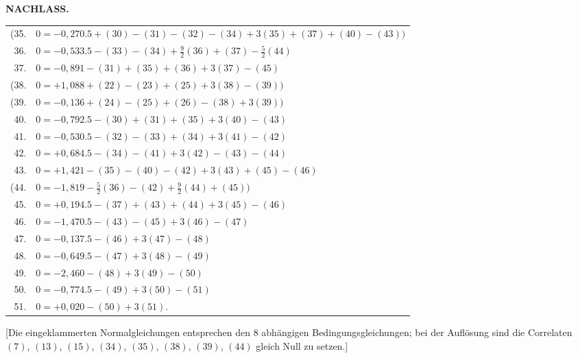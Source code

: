 \endgroup
\newpage
{}\hfill\textbf{NACHLASS.}
\begingroup
\renewcommand{\arraystretch}{1.16}
\begin{longtable}{@{}r@{\quad}l@{}}
(35.&$0=-0{,}270.5+(30)-(31)-(32)-(34)+3(35)+(37)+(40)-(43))$\\
36.&$0=-0{,}533.5-(33)-(34)+\frac92(36)+(37)-\frac52(44)$\\
37.&$0=-0{,}891-(31)+(35)+(36)+3(37)-(45)$\\
(38.&$0=+1{,}088+(22)-(23)+(25)+3(38)-(39))$\\
(39.&$0=-0{,}136+(24)-(25)+(26)-(38)+3(39))$\\
40.&$0=-0{,}792.5-(30)+(31)+(35)+3(40)-(43)$\\
41.&$0=-0{,}530.5-(32)-(33)+(34)+3(41)-(42)$\\
42.&$0=+0{,}684.5-(34)-(41)+3(42)-(43)-(44)$\\
43.&$0=+1{,}421-(35)-(40)-(42)+3(43)+(45)-(46)$\\
(44.&$0=-1{,}819-\frac52(36)-(42)+\frac92(44)+(45))$\\
45.&$0=+0{,}194.5-(37)+(43)+(44)+3(45)-(46)$\\
46.&$0=-1{,}470.5-(43)-(45)+3(46)-(47)$\\
47.&$0=-0{,}137.5-(46)+3(47)-(48)$\\
48.&$0=-0{,}649.5-(47)+3(48)-(49)$\\
49.&$0=-2{,}460-(48)+3(49)-(50)$\\
50.&$0=-0{,}774.5-(49)+3(50)-(51)$\\
51.&$0=+0{,}020-(50)+3(51).$\\
\end{longtable}
\endgroup

[Die eingeklammerten Normalgleichungen entsprechen den 8 abhängigen
Bedingungsgleichungen; bei der Auflösung sind die Correlaten $(7)$, $(13)$, $(15)$,
$(34)$, $(35)$, $(38)$, $(39)$, $(44)$ gleich Null zu setzen.]
